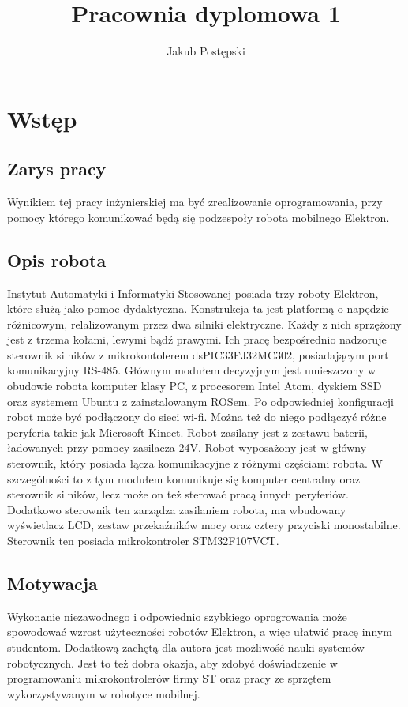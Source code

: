 \documentclass[10pt,a4paper]{article}
\author{Jakub Postępski}
\title{Pracownia dyplomowa 1}
\begin{document}
	\maketitle
	\section{Wstęp}
	\subsection{Zarys pracy}
	Wynikiem tej pracy inżynierskiej ma być zrealizowanie oprogramowania, przy pomocy którego komunikować będą się podzespoły robota mobilnego Elektron. 
	\subsection{Opis robota}
	Instytut Automatyki i Informatyki Stosowanej posiada trzy roboty Elektron, które służą jako pomoc dydaktyczna. Konstrukcja ta jest platformą o napędzie różnicowym, relalizowanym przez dwa silniki elektryczne. Każdy z nich sprzężony jest z trzema kołami, lewymi bądź prawymi. Ich pracę bezpośrednio nadzoruje sterownik silników z mikrokontolerem dsPIC33FJ32MC302, posiadającym port komunikacyjny RS-485. Głównym modułem decyzyjnym jest umieszczony w obudowie robota komputer klasy PC, z procesorem Intel Atom, dyskiem SSD oraz systemem Ubuntu z zainstalowanym ROSem. Po odpowiedniej konfiguracji robot może być podłączony do sieci wi-fi. Można też do niego podłączyć różne peryferia takie jak Microsoft Kinect. Robot zasilany jest z zestawu baterii, ładowanych przy pomocy zasilacza 24V. \newline
	Robot wyposażony jest w główny sterownik, który posiada łącza komunikacyjne z różnymi częściami robota. W szczególności to z tym modułem komunikuje się komputer centralny oraz sterownik silników, lecz może on też sterować pracą innych peryferiów. Dodatkowo sterownik ten zarządza zasilaniem robota, ma wbudowany wyświetlacz LCD, zestaw przekaźników mocy oraz cztery przyciski monostabilne. Sterownik ten posiada mikrokontroler STM32F107VCT.
	\subsection{Motywacja}
	Wykonanie niezawodnego i odpowiednio szybkiego oprogrowania może spowodować wzrost użyteczności robotów Elektron, a więc ułatwić pracę innym studentom. Dodatkową zachętą dla autora  jest możliwość nauki systemów robotycznych. Jest to też dobra okazja, aby zdobyć doświadczenie w programowaniu mikrokontrolerów firmy ST oraz pracy ze sprzętem wykorzystywanym w robotyce mobilnej. 
\end{document}
